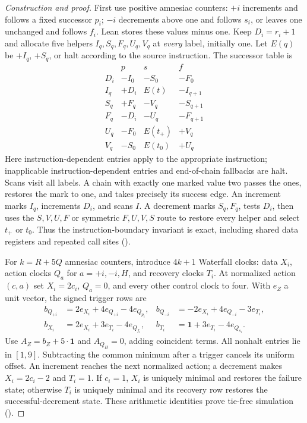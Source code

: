 \begin{proof}[Construction and proof]
First use positive amnesiac counters: $+i$ increments and follows a fixed
successor $p_i$; $-i$ decrements above one and follows $s_i$, or leaves one
unchanged and follows $f_i$.  Lean stores these values minus one.  Keep
$D_i=r_i+1$ and allocate five helpers $I_q,S_q,F_q,U_q,V_q$ at \emph{every}
label, initially one.  Let $E(q)$ be $+I_q$, $+S_q$, or halt according to the
source instruction.  The successor table is
\[
\begin{array}{c|ccc}
 &p&s&f\\\hline
D_i&-I_0&-S_0&-F_0\\
I_q&+D_i&E(t)&-I_{q+1}\\
S_q&+F_q&-V_q&-S_{q+1}\\
F_q&-D_i&-U_q&-F_{q+1}\\
U_q&-F_0&E(t_+)&+V_q\\
V_q&-S_0&E(t_0)&+U_q
\end{array}
\]
Here instruction-dependent entries apply to the appropriate instruction;
inapplicable instruction-dependent entries and end-of-chain fallbacks are halt.  Scans visit all
labels.  A chain with exactly one marked value two passes the ones, restores
the mark to one, and takes precisely its success edge.  An increment marks
$I_q$, increments $D_i$, and scans $I$.  A decrement marks $S_q,F_q$, tests
$D_i$, then uses the $S,V,U,F$ or symmetric $F,U,V,S$ route to restore every
helper and select $t_+$ or $t_0$.  Thus the instruction-boundary invariant is
exact, including shared data registers and repeated call sites
().

For $k=R+5Q$ amnesiac counters, introduce $4k+1$ Waterfall clocks: data $X_i$,
action clocks $Q_a$ for $a=+i,-i,H$, and recovery clocks $T_i$.
At normalized action $(c,a)$ set $X_i=2c_i$, $Q_a=0$, and every other control
clock to four.  With $e_Z$ a unit vector, the signed trigger rows are
\[
\begin{aligned}
b_{Q_{+i}}&=2e_{X_i}+4e_{Q_{+i}}-4e_{Q_{p_i}},&
b_{Q_{-i}}&=-2e_{X_i}+4e_{Q_{-i}}-3e_{T_i},\\
b_{X_i}&=2e_{X_i}+3e_{T_i}-4e_{Q_{f_i}},&
b_{T_i}&=\mathbf1+3e_{T_i}-4e_{Q_{s_i}}.
\end{aligned}
\]
Use $A_Z=b_Z+5\cdot\mathbf1$ and $A_{Q_H}=0$, adding coincident terms.
All nonhalt entries lie in $[1,9]$.  Subtracting the common minimum after a
trigger cancels its uniform offset.  An increment reaches the next normalized
action; a decrement makes $X_i=2c_i-2$ and $T_i=1$.  If $c_i=1$, $X_i$ is
uniquely minimal and restores the failure state; otherwise $T_i$ is uniquely
minimal and its recovery row restores the successful-decrement state.
These arithmetic identities prove tie-free simulation
().


\end{proof}
